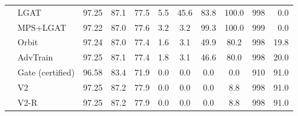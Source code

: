 \begin{tabular}{@{}llcccccccrr@{}}
 & LGAT & 97.25 & 87.1 & 77.5 & 5.5 & 45.6 & 83.8 & 100.0 & 998 & 0.0 \\
 & MPS+LGAT & 97.22 & 87.0 & 77.6 & 3.2 & 3.2 & 99.3 & 100.0 & 999 & 0.0 \\
 & Orbit & 97.24 & 87.0 & 77.4 & 1.6 & 3.1 & 49.9 & 80.2 & 998 & 19.8 \\
 & AdvTrain & 97.25 & 87.1 & 77.4 & 1.8 & 3.1 & 46.6 & 80.0 & 998 & 20.0 \\
 & Gate (certified) & 96.58 & 83.4 & 71.9 & 0.0 & 0.0 & 0.0 & 0.0 & 910 & 91.0 \\
 & V2 & 97.25 & 87.2 & 77.9 & 0.0 & 0.0 & 0.0 & 8.8 & 998 & 91.0 \\
 & V2-R & 97.25 & 87.2 & 77.9 & 0.0 & 0.0 & 0.0 & 8.8 & 998 & 91.0 \\
\bottomrule
\end{tabular}
